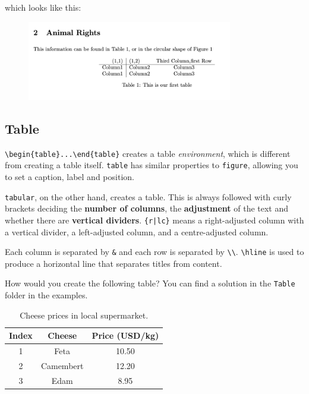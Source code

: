 
which looks like this:
\begin{figure}[h]
    \centering
        \includegraphics[width=0.8\textwidth]{figures/tables.png}
    \label{fig:tables}
\end{figure}

\subsection{Table}
\verb|\begin{table}...\end{table}| creates a table \emph{environment}, which is different from creating a table itself.
\verb|table| has similar properties to \verb|figure|, allowing you to set a caption, label and position.

\verb|tabular|, on the other hand, creates a table. This is always followed with curly brackets deciding the \textbf{number of columns}, the \textbf{adjustment} of the text and whether there are \textbf{vertical dividers}.
\verb!{r|lc}! means a right-adjusted column with a vertical divider, a left-adjusted column, and a centre-adjusted column.

Each column is separated by \verb|&| and each row is separated by \verb|\\|. \verb|\hline| is used to produce a horizontal line that separates titles from content.

How would you create the following table? You can find a solution in the \texttt{Table} folder in the examples.
\begin{table}[h]
\centering
\begin{tabular}{ccc}
    Index & Cheese & Price (USD/kg) \\ \hline
    1 & Feta & 10.50 \\
    2 & Camembert & 12.20 \\
    3 & Edam & 8.95 
\end{tabular}
    \caption{Cheese prices in local supermarket.}
\end{table}

